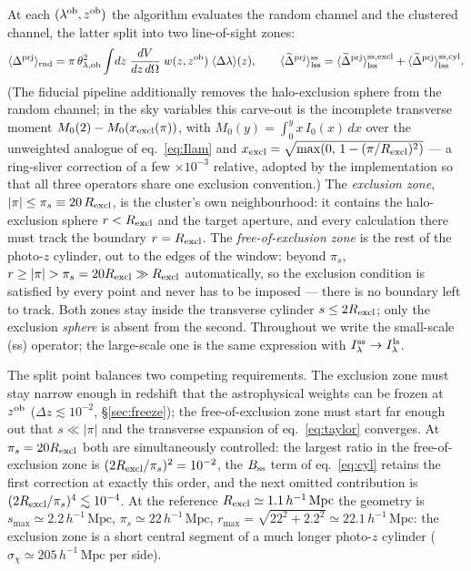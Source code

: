 \documentclass[a4paper, 11pt]{article}
\newcommand{\lob}{\lambda^{\rm ob}}
\newcommand{\zob}{z^{\rm ob}}
\newcommand{\dprj}{\Delta^{\rm prj}}
\newcommand{\hMpc}{h^{-1}\,\mathrm{Mpc}}
\newcommand{\Rex}{R_{\rm excl}}
\newcommand{\thob}{\theta_{\lambda,{\rm ob}}}
\newcommand{\Dl}{\langle \Delta\lambda\rangle}
\newcommand{\tDp}{\langle \widetilde{\Delta}^{\rm prj}\rangle}
\newcommand{\Dprnd}{\langle \dprj\rangle_{\rm rnd}}
\newcommand{\tDpss}{\langle \widetilde{\Delta}^{\rm prj}\rangle^{\rm ss}_{\rm lss}}
\newcommand{\Ilamss}{I_\lambda^{\rm ss}}
\newcommand{\Ilamls}{I_\lambda^{\rm ls}}
\newcommand{\pis}{\pi_s}
\newcommand{\rmax}{r_{\max}}
\newcommand{\Bss}{B_{\rm ss}}
\begin{document}
At each $(\lob,\zob)$ the algorithm evaluates the random channel
and the clustered channel, the latter split into two
line-of-sight zones:
\begin{equation}
\Dprnd = \pi\,\thob^2 \int\!dz\;\frac{dV}{dz\,d\Omega}\;
w(z,\zob)\;\Dl(z),
\qquad
\tDpss = \tDp^{\rm ss,excl}_{\rm lss} + \tDp^{\rm ss,cyl}_{\rm lss}.
\label{eq:alg_split}
\end{equation}
(The fiducial pipeline additionally removes the halo-exclusion
sphere from the random channel; in the sky variables this
carve-out is the incomplete transverse moment
$M_0(2)-M_0(x_{\rm excl}(\pi))$, with
$M_0(y)=\int_0^y x\,I_0(x)\,dx$ over the unweighted analogue of
eq.~\ref{eq:Ilam} and
$x_{\rm excl}=\sqrt{\max(0,\,1-(\pi/\Rex)^2)}$ --- a ring-sliver
correction of a few $\times10^{-3}$ relative, adopted by the
implementation so that all three operators share one exclusion
convention.) The \emph{exclusion zone}, $|\pi|\le\pis\equiv20\,\Rex$, is the
cluster's own neighbourhood: it contains the halo-exclusion
sphere $r<\Rex$ and the target aperture, and every calculation
there must track the boundary $r=\Rex$. The
\emph{free-of-exclusion zone} is the rest of the photo-$z$
cylinder, out to the edges of the window: beyond $\pis$,
$r\ge|\pi|>\pis=20\Rex\gg\Rex$ automatically, so the exclusion
condition is satisfied by every point and never has to be
imposed --- there is no boundary left to track. Both zones stay
inside the transverse cylinder $s\le2\Rex$; only the exclusion
\emph{sphere} is absent from the second. Throughout we write the
small-scale (ss) operator; the large-scale one is the same
expression with $\Ilamss\to \Ilamls$.

The split point balances two competing requirements. The
exclusion zone must stay narrow enough in redshift that the
astrophysical weights can be frozen at $\zob$
($\Delta z\lesssim10^{-2}$, \S\ref{sec:freeze}); the
free-of-exclusion zone must start far enough out that
$s\ll|\pi|$ and the transverse expansion of
eq.~\eqref{eq:taylor} converges. At $\pis=20\Rex$ both are
simultaneously controlled: the largest ratio in the
free-of-exclusion zone is $(2\Rex/\pis)^2 = 10^{-2}$, the
$\Bss$ term of eq.~\eqref{eq:cyl} retains the first
correction at exactly this order, and the next omitted
contribution is $(2\Rex/\pis)^4\lesssim10^{-4}$. At the
reference $\Rex\simeq1.1\,\hMpc$ the geometry is
$s_{\max}\simeq2.2\,\hMpc$, $\pis\simeq22\,\hMpc$,
$\rmax=\sqrt{22^2+2.2^2}\simeq22.1\,\hMpc$: the exclusion
zone is a short central segment of a much longer photo-$z$
cylinder ($\sigma_\chi\simeq205\,\hMpc$ per side).
\end{document}

